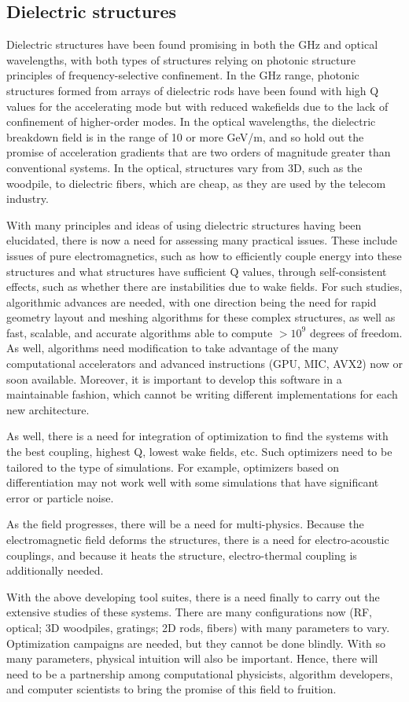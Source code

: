 \subsection{Dielectric structures}

Dielectric structures have been found promising in both the GHz
and optical wavelengths, with both types of structures relying on
photonic structure principles of frequency-selective confinement.
In the GHz range, photonic structures formed from arrays of
dielectric rods have been found with high Q values for the
accelerating mode but with reduced wakefields due to the lack of
confinement of higher-order modes.  In the optical wavelengths,
the dielectric breakdown field is in the range of 10 or more
GeV/m, and so hold out the promise of acceleration gradients that
are two orders of magnitude greater than conventional systems.
In the optical, structures vary from 3D, such as the woodpile, to
dielectric fibers, which are cheap, as they are used by the
telecom industry.

With many principles and ideas of using dielectric structures
having been elucidated, there is now a need for assessing many
practical issues.  These include issues of pure electromagnetics,
such as how to efficiently couple energy into these structures
and what structures have sufficient Q values, through
self-consistent effects, such as whether there are instabilities
due to wake fields.  For such studies, algorithmic advances are
needed, with one direction being the need for rapid geometry
layout and meshing algorithms for these complex structures, as
well as fast, scalable, and accurate algorithms able to compute
$>10^9$ degrees of freedom.  As well, algorithms need modification
to take advantage of the many computational accelerators and
advanced instructions (GPU, MIC, AVX2) now or soon available.
Moreover, it is important to develop this software in a
maintainable fashion, which cannot be writing different
implementations for each new architecture.

As well, there is a need for integration of optimization to find
the systems with the best coupling, highest Q, lowest wake
fields, etc.  Such optimizers need to be tailored to the type of
simulations.  For example, optimizers based on differentiation
may not work well with some simulations that have significant
error or particle noise.

As the field progresses, there will be a need for multi-physics.
Because the electromagnetic field deforms the structures, there
is a need for electro-acoustic couplings, and because it heats
the structure, electro-thermal coupling is additionally needed.

With the above developing tool suites, there is a need finally to
carry out the extensive studies of these systems.  There are many
configurations now (RF, optical; 3D woodpiles, gratings; 2D rods,
fibers) with many parameters to vary.  Optimization campaigns are
needed, but they cannot be done blindly.  With so many
parameters, physical intuition will also be important.  Hence,
there will need to be a partnership among computational
physicists, algorithm developers, and computer scientists to
bring the promise of this field to fruition.

